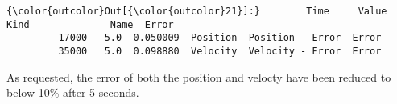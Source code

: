 \documentclass[11pt]{article}
\begin{document}
\begin{Verbatim}[commandchars=\\\{\}]
{\color{outcolor}Out[{\color{outcolor}21}]:}        Time     Value      Kind              Name  Error
         17000   5.0 -0.050009  Position  Position - Error  Error
         35000   5.0  0.098880  Velocity  Velocity - Error  Error
\end{Verbatim}
            
    As requested, the error of both the position and velocty have been
reduced to below 10\% after 5 seconds.


    
    
    
    
\end{document}
